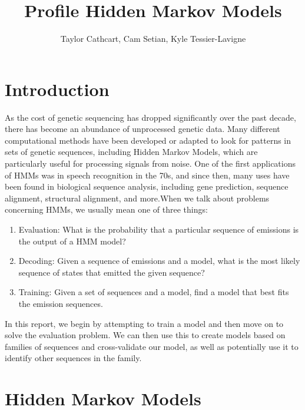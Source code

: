 \documentclass{article}
\title{Profile Hidden Markov Models}
\author{Taylor Cathcart, Cam Setian, Kyle Tessier-Lavigne}
\begin{document}
\maketitle

\section{Introduction}

As the cost of genetic sequencing has dropped significantly over the past decade, there has become an abundance of unprocessed genetic data. Many different computational methods have been developed or adapted to look for patterns in sets of genetic sequences, including Hidden Markov Models, which are particularly useful for processing signals from noise. One of the first applications of HMMs was in speech recognition in the 70s, and since then, many uses have been found in biological sequence analysis, including gene prediction, sequence alignment, structural alignment, and more.\footnotemark[1] When we talk about problems concerning HMMs, we usually mean one of three things:
\begin{enumerate}
\item Evaluation: What is the probability that a particular sequence of emissions is the output of a HMM model?
\item Decoding: Given a sequence of emissions and a model, what is the most likely sequence of states that emitted the given sequence?
\item Training: Given a set of sequences and a model, find a model that best fits the emission sequences.
\end{enumerate}
In this report, we begin by attempting to train a model and then move on to solve the evaluation problem. We can then use this to create models based on families of sequences and cross-validate our model, as well as potentially use it to identify other sequences in the family.


\section{Hidden Markov Models}
\end{document}
